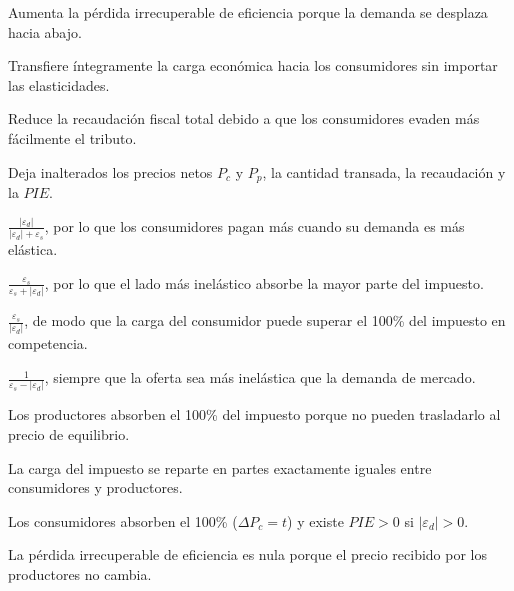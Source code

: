 \begin{opts}
    \item Aumenta la pérdida irrecuperable de eficiencia porque la demanda se desplaza hacia abajo.
    \item Transfiere íntegramente la carga económica hacia los consumidores sin importar las elasticidades.
    \item Reduce la recaudación fiscal total debido a que los consumidores evaden más fácilmente el tributo.
    \item Deja inalterados los precios netos $P_c$ y $P_p$, la cantidad transada, la recaudación y la $PIE$.
\end{opts}

\begin{opts}
    \item $\frac{|\varepsilon_d|}{|\varepsilon_d| + \varepsilon_s}$, por lo que los consumidores pagan más cuando su demanda es más elástica.
    \item $\frac{\varepsilon_s}{\varepsilon_s + |\varepsilon_d|}$, por lo que el lado más inelástico absorbe la mayor parte del impuesto.
    \item $\frac{\varepsilon_s}{|\varepsilon_d|}$, de modo que la carga del consumidor puede superar el 100\% del impuesto en competencia.
    \item $\frac{1}{\varepsilon_s - |\varepsilon_d|}$, siempre que la oferta sea más inelástica que la demanda de mercado.
\end{opts}

\begin{opts}
    \item Los productores absorben el 100\% del impuesto porque no pueden trasladarlo al precio de equilibrio.
    \item La carga del impuesto se reparte en partes exactamente iguales entre consumidores y productores.
    \item Los consumidores absorben el 100\% ($\Delta P_c = t$) y existe $PIE > 0$ si $|\varepsilon_d| > 0$.
    \item La pérdida irrecuperable de eficiencia es nula porque el precio recibido por los productores no cambia.
\end{opts}

